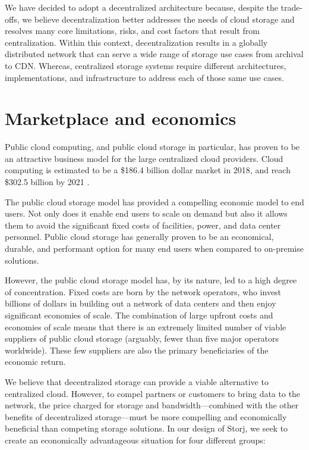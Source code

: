 \documentclass[8pt,fleqn,openany]{book}
\begin{document}
We have decided to adopt a decentralized architecture because, despite the trade-offs, we believe decentralization better addresses the needs of cloud storage
and resolves many core limitations, risks, and cost factors that result from
centralization. Within this context,
decentralization results in a globally distributed network that can
serve a wide range of storage use cases from archival to CDN. Whereas,
centralized storage systems require different architectures, implementations,
and infrastructure to address each of those same use cases.

\section{Marketplace and economics}

Public cloud computing, and public cloud storage in particular, has
proven to be an attractive business model for the large centralized cloud
providers. Cloud computing is estimated to be a \$186.4 billion dollar market
in 2018, and reach \$302.5 billion by 2021 \cite{gartner-cloud-growth}.

The public cloud storage model has provided a compelling economic model to end
users. Not only does it enable end users to scale on demand but also it allows them to avoid the significant fixed costs of facilities, power, and data center
personnel. Public cloud storage has generally proven to be an economical,
durable, and performant option for many end users when compared to
on-premise solutions.

However, the public cloud storage model has, by its nature, led to a high
degree of concentration. Fixed costs are born by the network operators, who
invest billions of dollars in building out a network of data centers and
then enjoy significant economies of scale. The combination of large upfront
costs and economies of scale means that there is an extremely limited number
of viable suppliers of public cloud storage (arguably, fewer than five major
operators worldwide). These few suppliers are also the primary beneficiaries of
the economic return.

We believe that decentralized storage can provide a viable alternative to
centralized cloud.
However, to compel partners or customers to bring data to the network,
the price charged for storage and bandwidth---combined with the other
benefits of decentralized storage---must be
more compelling and economically beneficial than competing storage solutions.
In our design of Storj, we seek to create an economically advantageous
situation for four different groups:
\end{document}
